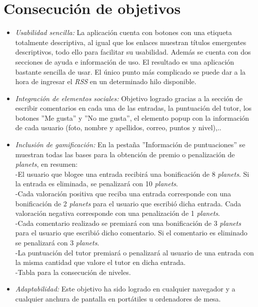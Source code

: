 \documentclass[a4paper, 12pt]{book}
\begin{document}
\section{Consecuci\'on de objetivos}
\label{sec:consecucion-objetivos}
\begin{itemize}
  \item \textit {Usabilidad sencilla:} La aplicaci\'on cuenta con botones con una etiqueta totalmente descriptiva, al 
  igual que los enlaces muestran t\'itulos emergentes descriptivos, todo ello para facilitar su usabilidad. Adem\'as se cuenta con dos 
  secciones de ayuda e informaci\'on de uso. El resultado es una aplicaci\'on bastante sencilla de usar. El \'unico punto m\'as complicado se puede dar a la hora de 
  ingresar el \textit{RSS} en un determinado hilo disponible.
  \item \textit {Integraci\'on de elementos sociales:} Objetivo logrado gracias a la secci\'on de escribir comentarios en cada una de las entradas, la puntuaci\'on del tutor, los 
  botones ''Me gusta'' y ''No me gusta'', el elemento popup con la informaci\'on de cada usuario (foto, nombre y apellidos, correo, puntos y nivel),..
  \item \textit {Inclusi\'on de gamificaci\'on:} En la pesta\~na ''Informaci\'on de puntuaciones'' se muestran todas las bases para la obtenci\'on de premio o 
  penalizaci\'on de \textit{planets}, en resumen:\\
  -El usuario que blogee una entrada recibir\'a una bonificaci\'on de 8 \textit{planets}. Si la entrada es eliminada, se penalizar\'a con 10 \textit{planets}.\\
  -Cada valoraci\'on positiva que reciba una entrada corresponde con una bonificaci\'on de 2 \textit{planets} para el usuario que escribi\'o dicha entrada. Cada valoraci\'on 
  negativa corresponde con una penalizaci\'on de 1 \textit{planets}.\\
  -Cada comentario realizado se premiar\'a con una bonificaci\'on de 3 \textit{planets} para el usuario que escribi\'o dicho comentario. Si el comentario es eliminado se 
  penalizar\'a con 3 \textit{planets}.\\
  -La puntuaci\'on del tutor premiar\'a o penalizar\'a al usuario de una entrada con la misma cantidad que valore el tutor en dicha entrada.\\
  -Tabla para la consecuci\'on de niveles.\\
  \item \textit {Adaptabilidad:} Este objetivo ha sido logrado en cualquier navegador y a cualquier anchura de pantalla en port\'atiles u ordenadores de mesa. 

\end{itemize}
\end{document}
